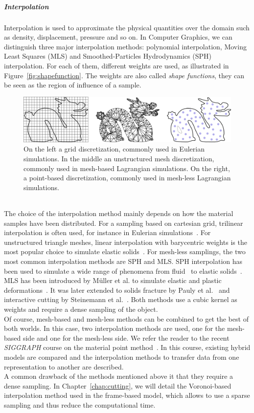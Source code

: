 \subparagraph{Interpolation}
Interpolation is used to approximate the physical quantities over the domain such as density, displacement, pressure and so on. 
In Computer Graphics, we can distinguish three major interpolation methods: polynomial interpolation, Moving Least Squares (MLS) and Smoothed-Particles Hydrodynamics (SPH) interpolation. 
For each of them, different weights are used, as illustrated in Figure~\ref{fig:shapefunction}. The weights are also called \emph{shape functions}, they can be seen as the region of influence of a sample.
\begin{figure}[!h]
	\centering
	\includegraphics[width=\linewidth]{images/continuum_mechanics/discretization.png}
	\caption[STAR mechanics: Discretization]{\label{fig:discretization} On the left a grid discretization, commonly used in Eulerian simulations. In the middle an unstructured mesh discretization, commonly used in mesh-based Lagrangian simulations. On the right, a point-based discretization, commonly used in mesh-less Lagrangian simulations.}
\end{figure}
\\
The choice of the interpolation method mainly depends on how the material samples have been distributed. 
For a sampling based on cartesian grid, trilinear interpolation is often used, for instance in Eulerian simulations~\cite{Bridson2008}. 
For unstructured triangle meshes, linear interpolation with barycentric weights is the most popular choice to simulate elastic solids~\cite{Muller2008}.
For mesh-less samplings, the two most common interpolation methods are SPH and MLS.
SPH interpolation has been used to simulate a wide range of phenomena from fluid~\cite{Desbrun1999} to elastic solids~\cite{Becker2009}.
MLS has been introduced by M\"{u}ller et al. to simulate elastic and plastic deformations~\cite{Muller2004:melting}.
It was later extended to solids fracture by Pauly et al.~\cite{Pauly2005} and interactive cutting by Steinemann et al.~\cite{Steinemann2009}.
Both methods use a cubic kernel as weights and require a dense sampling of the object.
\\
Of course, mesh-based and mesh-less methods can be combined to get the best of both worlds.
In this case, two interpolation methods are used, one for the mesh-based side and one for the mesh-less side.
We refer the reader to the recent \emph{SIGGRAPH} course on the material point method~\cite{Jiang2016}.
In this course, existing hybrid models are compared and the interpolation methods to transfer data from one representation  to another are described.
\\
A common drawback of the methods mentioned above it that they require a dense sampling. In Chapter~\ref{chap:cutting}, we will detail the Voronoi-based interpolation method used in the frame-based model, which allows to use a sparse sampling and thus reduce the computational time.

